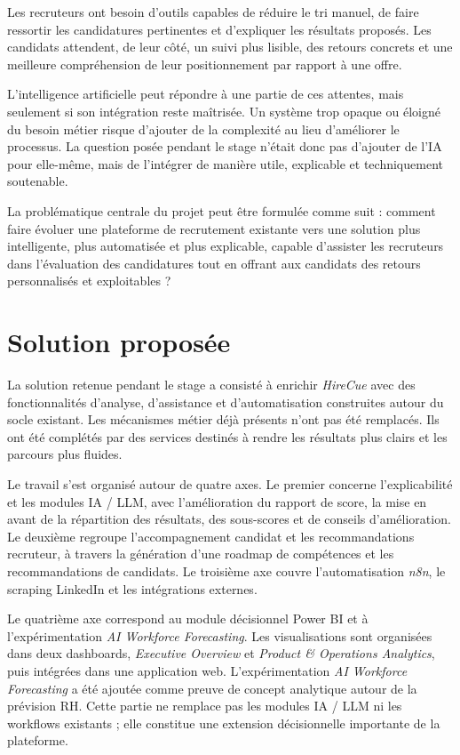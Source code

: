 Les recruteurs ont besoin d'outils capables de réduire le tri manuel, de faire ressortir les candidatures pertinentes et d'expliquer les résultats proposés. Les candidats attendent, de leur côté, un suivi plus lisible, des retours concrets et une meilleure compréhension de leur positionnement par rapport à une offre.

L'intelligence artificielle peut répondre à une partie de ces attentes, mais seulement si son intégration reste maîtrisée. Un système trop opaque ou éloigné du besoin métier risque d'ajouter de la complexité au lieu d'améliorer le processus. La question posée pendant le stage n'était donc pas d'ajouter de l'IA pour elle-même, mais de l'intégrer de manière utile, explicable et techniquement soutenable.

La problématique centrale du projet peut être formulée comme suit : comment faire évoluer une plateforme de recrutement existante vers une solution plus intelligente, plus automatisée et plus explicable, capable d'assister les recruteurs dans l'évaluation des candidatures tout en offrant aux candidats des retours personnalisés et exploitables ?

\section{Solution proposée}

La solution retenue pendant le stage a consisté à enrichir \textit{HireCue} avec des fonctionnalités d'analyse, d'assistance et d'automatisation construites autour du socle existant. Les mécanismes métier déjà présents n'ont pas été remplacés. Ils ont été complétés par des services destinés à rendre les résultats plus clairs et les parcours plus fluides.

Le travail s'est organisé autour de quatre axes. Le premier concerne l'explicabilité et les modules IA / LLM, avec l'amélioration du rapport de score, la mise en avant de la répartition des résultats, des sous-scores et de conseils d'amélioration. Le deuxième regroupe l'accompagnement candidat et les recommandations recruteur, à travers la génération d'une roadmap de compétences et les recommandations de candidats. Le troisième axe couvre l'automatisation \textit{n8n}, le scraping LinkedIn et les intégrations externes.

Le quatrième axe correspond au module décisionnel Power BI et à l'expérimentation \textit{AI Workforce Forecasting}.
Les visualisations sont organisées dans deux dashboards, \textit{Executive Overview} et \textit{Product \& Operations Analytics}, puis intégrées dans une application web. L'expérimentation \textit{AI Workforce Forecasting} a été ajoutée comme preuve de concept analytique autour de la prévision RH. Cette partie ne remplace pas les modules IA / LLM ni les workflows existants ; elle constitue une extension décisionnelle importante de la plateforme.

